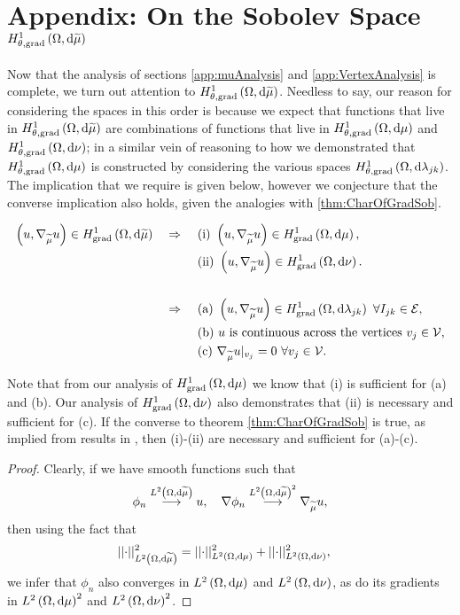 \section{Appendix: On the Sobolev Space $H^1_{\theta, \mathrm{grad}}\left( \Omega, \mathrm{d}\widetilde{\mu} \right)$} \label{app:SumMeasureAnalysis}
Now that the analysis of sections \ref{app:muAnalysis} and \ref{app:VertexAnalysis} is complete, we turn out attention to $H^1_{\theta, \mathrm{grad}}\left( \Omega, \mathrm{d}\widetilde{\mu} \right)$.
Needless to say, our reason for considering the spaces in this order is because we expect that functions that live in $H^1_{\theta, \mathrm{grad}}\left( \Omega, \mathrm{d}\widetilde{\mu} \right)$ are combinations of functions that live in $H^1_{\theta, \mathrm{grad}}\left( \Omega, \mathrm{d}\mu \right)$ and $H^1_{\theta, \mathrm{grad}}\left( \Omega, \mathrm{d}\nu \right)$; in a similar vein of reasoning to how we demonstrated that $H^1_{\theta, \mathrm{grad}}\left( \Omega, \mathrm{d}\mu \right)$ is constructed by considering the various spaces $H^1_{\theta, \mathrm{grad}}\left( \Omega, \mathrm{d}\lambda_{jk} \right)$.
The implication that we require is given below, however we conjecture that the converse implication also holds, given the analogies with \ref{thm:CharOfGradSob}.
\begin{theorem} \label{thm:ThickVertexSpaceCharacterisation}
	\begin{align*}
		\left( u, \nabla_{\widetilde{\mu}}u \right)\in H^1_\mathrm{grad}\left( \Omega, \mathrm{d}\widetilde{\mu} \right) \quad\Rightarrow\quad
		& \ \text{(i)} \ \left( u, \nabla_{\widetilde{\mu}}u \right)\in H^1_\mathrm{grad}\left( \Omega, \mathrm{d}\mu \right), \\
		& \ \text{(ii)} \ \left( u, \nabla_{\widetilde{\mu}}u \right)\in H^1_\mathrm{grad}\left( \Omega, \mathrm{d}\nu \right). \\
		\\
		\quad\Rightarrow\quad
		& \ \text{(a)} \ \left( u, \nabla_{\widetilde{\mu}}u \right)\in H^1_\mathrm{grad}\left( \Omega, \mathrm{d}\lambda_{jk} \right) \ \forall I_{jk}\in\mathcal{E}, \\
		& \ \text{(b)} \ u \text{ is continuous across the vertices} \ v_j\in\mathcal{V}, \\
		& \ \text{(c)} \ \nabla_{\widetilde{\mu}}u\vert_{v_j} = 0 \ \forall v_j\in\mathcal{V}.
	\end{align*}
\end{theorem}
Note that from our analysis of $H^1_\mathrm{grad}\left( \Omega, \mathrm{d}\mu \right)$ we know that (i) is sufficient for (a) and (b).
Our analysis of $H^1_\mathrm{grad}\left( \Omega, \mathrm{d}\nu \right)$ also demonstrates that (ii) is necessary and sufficient for (c).
If the converse to theorem \ref{thm:CharOfGradSob} is true, as implied from results in \cite{zhikov2002homogenization}, then (i)-(ii) are necessary and sufficient for (a)-(c).
\begin{proof}
	Clearly, if we have smooth functions such that
	\begin{align*}
		\phi_n \overset{L^{2}\left( \Omega,\mathrm{d}\widetilde{\mu} \right)}{\longrightarrow} u, \quad \nabla\phi_n\overset{L^{2}\left( \Omega,\mathrm{d}\widetilde{\mu} \right)^2}{\longrightarrow}\nabla_{\widetilde{\mu}}u,
	\end{align*}
	then using the fact that
	\begin{align*}
		\lvert\lvert \cdot \rvert\rvert_{L^{2}\left( \Omega,\mathrm{d}\widetilde{\mu} \right)}^2 &= \lvert\lvert \cdot \rvert\rvert_{L^{2}\left( \Omega,\mathrm{d}\mu \right)}^2 + \lvert\lvert \cdot \rvert\rvert_{L^{2}\left( \Omega,\mathrm{d}\nu \right)}^2,
	\end{align*}
	we infer that $\phi_n$ also converges in $L^{2}\left( \Omega,\mathrm{d}\mu \right)$ and $L^{2}\left( \Omega,\mathrm{d}\nu \right)$, as do its gradients in $L^{2}\left( \Omega,\mathrm{d}\mu \right)^2$ and $L^{2}\left( \Omega,\mathrm{d}\nu \right)^2$.
\end{proof}
